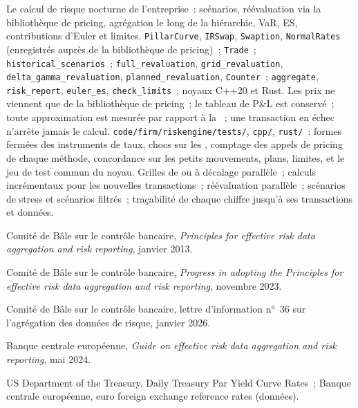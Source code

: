 \begin{build}
 Le calcul de risque nocturne de l'entreprise~: scénarios, réévaluation via la bibliothèque de pricing,
agrégation le long de la hiérarchie, VaR, ES, contributions d'Euler et limites.
 \texttt{PillarCurve}, \texttt{IRSwap}, \texttt{Swaption}, \texttt{NormalRates}
 (enregistrés auprès de la bibliothèque de pricing)~; \texttt{Trade}~; \texttt{historical\_scenarios}~;
\texttt{full\_revaluation}, \texttt{grid\_revaluation}, \texttt{delta\_gamma\_revaluation},
\texttt{planned\_revaluation}, \texttt{Counter}~; \texttt{aggregate}, \texttt{risk\_report},
\texttt{euler\_es}, \texttt{check\_limits}~; noyaux C++20 et Rust.
 Les prix ne viennent que de la bibliothèque de pricing~; le tableau de P\&L est conservé~; toute approximation est
mesurée par rapport à la ~; une transaction en échec n'arrête jamais le calcul.
 \texttt{code/firm/riskengine/tests/}, \texttt{cpp/}, \texttt{rust/}~: formes fermées des
instruments de taux, chocs sur les , comptage des appels de pricing de chaque méthode, concordance sur les petits mouvements, plans, limites, et le
jeu de test commun du noyau.
 Grilles de  ou à décalage parallèle~; calculs incrémentaux pour les nouvelles transactions~; réévaluation parallèle~;
scénarios de stress et scénarios filtrés~; traçabilité de chaque chiffre jusqu'à ses transactions et données.
\end{build}

\begin{omsources}
\item Comité de Bâle sur le contrôle bancaire, \emph{Principles for effective risk data aggregation and risk
reporting}, janvier 2013.
\item Comité de Bâle sur le contrôle bancaire, \emph{Progress in adopting the Principles for effective risk data
aggregation and risk reporting}, novembre 2023.
\item Comité de Bâle sur le contrôle bancaire, lettre d'information n°~36 sur l'agrégation des données de risque, janvier 2026.
\item Banque centrale européenne, \emph{Guide on effective risk data aggregation and risk reporting}, mai 2024.
\item US Department of the Treasury, Daily Treasury Par Yield Curve Rates~; Banque centrale européenne, euro foreign
exchange reference rates (données).
\end{omsources}

